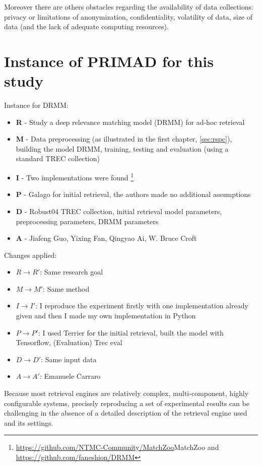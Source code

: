 Moreover there are others obstacles regarding the availability of data collections: privacy or limitations of anonymization, confidentiality, volatility of data, size of data (and the lack of adequate computing resources).

\section{Instance of PRIMAD for this study}

Instance for DRMM:

\begin{itemize}
\item \textbf{R} - Study a deep relevance matching model (DRMM) for ad-hoc retrieval
\item \textbf{M} - Data preprocessing (as illustrated in the first chapter, \ref{sec:rspc}), building the model DRMM, training, testing and evaluation (using a standard TREC collection)
\item \textbf{I} - Two implementations were found \footnote{\url{https://github.com/NTMC-Community/MatchZoo}{MatchZoo} \cite{matchzoo} and \url{https://github.com/faneshion/DRMM}}
\item \textbf{P} - Galago for initial retrieval, the authors made no additional assumptions
\item \textbf{D} - Robust04 TREC collection, initial retrieval model parameters, preprocessing parameters, DRMM parameters
\item \textbf{A} - Jiafeng Guo, Yixing Fan, Qingyao Ai, W. Bruce Croft
\end{itemize}

Changes applied:

\begin{itemize}
\item $R \rightarrow R'$: Same research goal
\item $M \rightarrow M'$: Same method
\item $I \rightarrow I'$: I reproduce the experiment firstly with one implementation already given and then I made my own implementation in Python
\item $P \rightarrow P'$: I used Terrier for the initial retrieval, built the model with Tensorflow, (Evaluation) Trec eval
\item $D \rightarrow D'$: Same input data
\item $A \rightarrow A'$: Emanuele Carraro
\end{itemize}

Because most retrieval engines are relatively complex, multi-component, highly configurable systems, precisely reproducing a set of experimental results can be challenging in the absence of a detailed description of the retrieval engine used and its settings.

